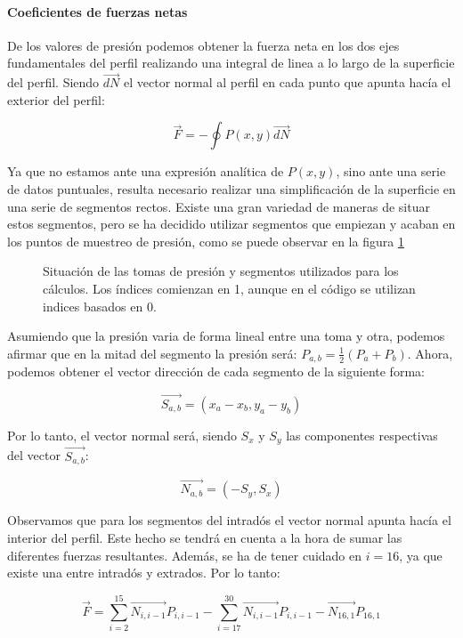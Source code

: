 \documentclass{article}
\begin{document}
\paragraph{Coeficientes de fuerzas netas}

De los valores de presión podemos obtener la fuerza neta en los dos ejes fundamentales del perfil realizando una integral
de linea a lo largo de la superficie del perfil. Siendo $\vec{dN}$ el vector normal al perfil en cada punto que apunta hacía
el exterior del perfil:

$$\vec{F} = - \oint P(x, y) \vec{dN}$$ 

Ya que no estamos ante una expresión analítica de $P(x, y)$, sino ante una serie de datos puntuales, resulta necesario realizar
una simplificación de la superficie en una serie de segmentos rectos. Existe una gran variedad de maneras de situar estos 
segmentos, pero se ha decidido utilizar segmentos que empiezan y acaban en los puntos de muestreo de presión, como se puede 
observar en la figura \ref{fig:NACA}

\begin{figure}[h!]
    
    \caption{Situación de las tomas de presión y segmentos utilizados para los cálculos. Los índices comienzan en 1,
    aunque en el código se utilizan indices basados en 0.}
    \label{fig:NACA}    
\end{figure}

Asumiendo que la presión varia de forma lineal entre una toma y otra, podemos afirmar que en la mitad del segmento la presión 
será: $P_{a, b} = \frac{1}{2}(P_{a} + P_{b})$. Ahora, podemos obtener el vector dirección de cada segmento de la 
siguiente forma:

$$\vec{S_{a,b}} = (x_{a} - x_{b}, y_{a} - y_{b})$$

Por lo tanto, el vector normal será, siendo $S_x$ y $S_y$ las componentes respectivas del vector $\vec{S_{a,b}}$:

$$\vec{N_{a, b}} = (-S_y, S_x)$$

Observamos que para los segmentos del intradós el vector normal apunta hacía el interior del perfil. Este hecho se tendrá
en cuenta a la hora de sumar las diferentes fuerzas resultantes. Además, se ha de tener cuidado en $i=16$, ya que existe 
una  entre intradós y extrados. Por lo tanto:

$$\vec{F} = 
\sum_{i = 2}^{15} \vec{N_{i, i-1}} P_{i, i-1} - 
\sum_{i=17}^{30} \vec{N_{i, i-1}} P_{i, i-1} -
\vec{N_{16, 1}} P_{16, 1} $$
\end{document}
